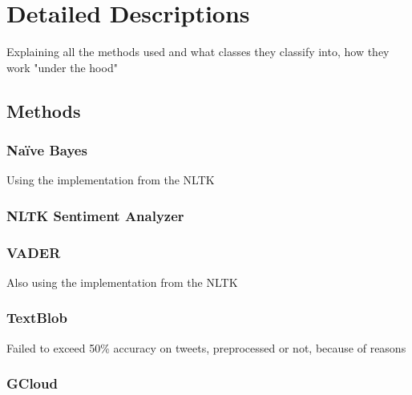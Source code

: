 \chapter{Detailed Descriptions}
\label{chapter:DetailedDescriptions}\label{sentimentanalysis}


Explaining all the methods used and what classes they classify into, how they work "under the hood"

\section{Methods}
\label{sec:methods}

\subsection{Na\"{i}ve Bayes}
\label{subsec:naivebayes}

Using the implementation from the NLTK

\subsection{NLTK Sentiment Analyzer}
\label{subsec:nltksentimentanalyzer}

\subsection{VADER}
\label{subsec:vader}

Also using the implementation from the NLTK

\subsection{TextBlob}
\label{subsec:textblob}

Failed to exceed 50\% accuracy on tweets, preprocessed or not, because of reasons

\subsection{GCloud}
\label{subsec:gcloud}

